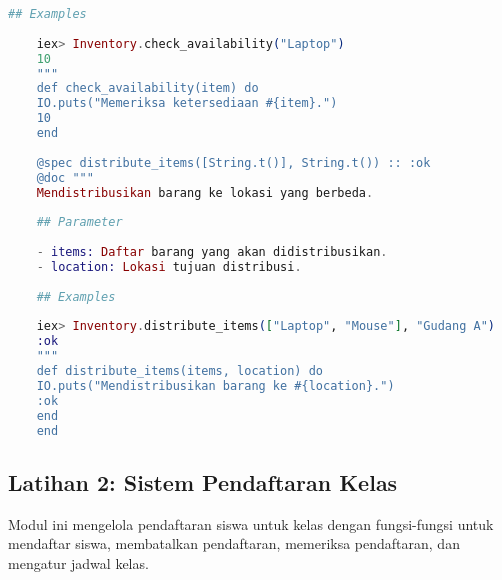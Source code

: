 \begin{lstlisting}[language=Elixir, caption={Modul Manajemen Inventaris}]
	## Examples
	
	iex> Inventory.check_availability("Laptop")
	10
	"""
	def check_availability(item) do
	IO.puts("Memeriksa ketersediaan #{item}.")
	10
	end
	
	@spec distribute_items([String.t()], String.t()) :: :ok
	@doc """
	Mendistribusikan barang ke lokasi yang berbeda.
	
	## Parameter
	
	- items: Daftar barang yang akan didistribusikan.
	- location: Lokasi tujuan distribusi.
	
	## Examples
	
	iex> Inventory.distribute_items(["Laptop", "Mouse"], "Gudang A")
	:ok
	"""
	def distribute_items(items, location) do
	IO.puts("Mendistribusikan barang ke #{location}.")
	:ok
	end
	end
\end{lstlisting}

\subsection{Latihan 2: Sistem Pendaftaran Kelas}

Modul ini mengelola pendaftaran siswa untuk kelas dengan fungsi-fungsi untuk mendaftar siswa, membatalkan pendaftaran, memeriksa pendaftaran, dan mengatur jadwal kelas.

